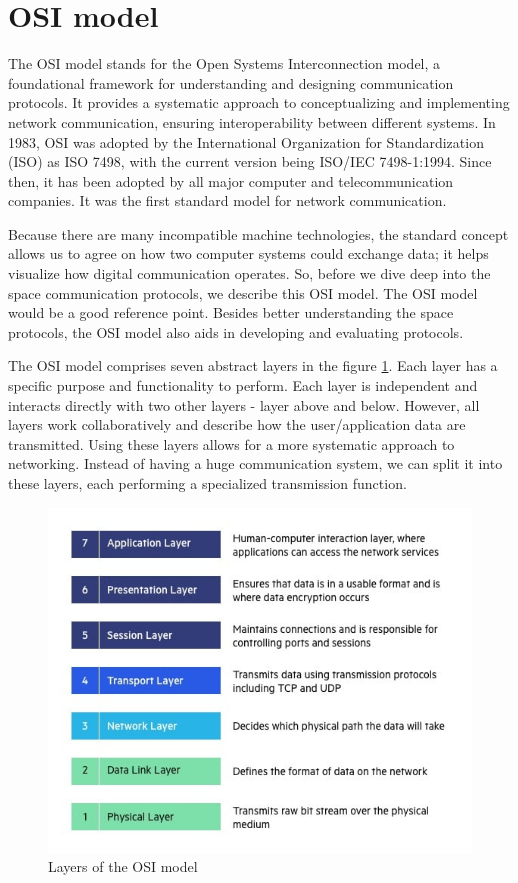 \documentclass[conference]{IEEEtran}
\begin{document}
\section{OSI model}
The OSI model stands for the Open Systems Interconnection model, a foundational framework for understanding and designing communication protocols. It provides a systematic approach to conceptualizing and implementing network communication, ensuring interoperability between different systems. In 1983, OSI was adopted by the International Organization for Standardization (ISO) as ISO 7498, with the current version being ISO/IEC 7498-1:1994\cite{AWS-Amazon}. Since then, it has been adopted by all major computer and telecommunication companies. It was the first standard model for network communication. \cite{impreva-osi}

Because there are many incompatible machine technologies, the standard concept allows us to agree on how two computer systems could exchange data; it helps visualize how digital communication operates. So, before we dive deep into the space communication protocols, we describe this OSI model. The OSI model would be a good reference point. Besides better understanding the space protocols, the OSI model also aids in developing and evaluating protocols.

The OSI model comprises seven abstract layers in the figure \ref{osi}. Each layer has a specific purpose and functionality to perform. Each layer is independent and interacts directly with two other layers - layer above and below. However, all layers work collaboratively and describe how the user/application data are transmitted. Using these layers allows for a more systematic approach to networking. Instead of having a huge communication system, we can split it into these layers, each performing a specialized transmission function. \cite{geeks-osi}

\begin{figure}[htbp]
    \centerline{\includegraphics[width=\linewidth]{images/OSI-7-layers}}
    \caption{Layers of the OSI model\cite{impreva-osi}}
    \label{osi}
\end{figure}
\end{document}
